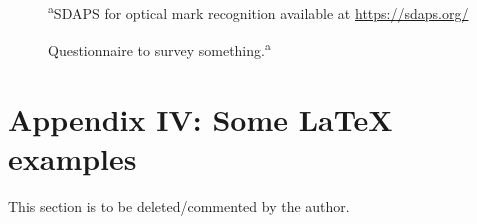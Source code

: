 	\begin{figure}[H]
		\centering
		\caption[Questionnaire]{Questionnaire to survey something.\textsuperscript{a}}
		\small\textsuperscript{a}{SDAPS for optical mark recognition available at \url{https://sdaps.org/}}
	\end{figure}

\clearpage  %
\section*{Appendix IV: Some \LaTeX{} examples}

This section is to be deleted/commented by the author.
